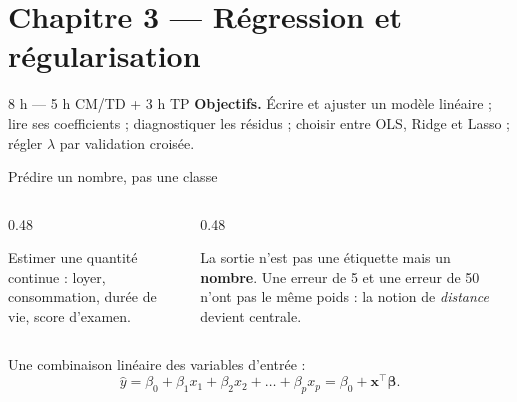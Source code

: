 \section{Chapitre 3 --- Régression et régularisation}

%
{8 h --- 5 h CM/TD + 3 h TP}%
{\textbf{Objectifs.} Écrire et ajuster un modèle linéaire ; lire ses coefficients ;
diagnostiquer les résidus ; choisir entre OLS, Ridge et Lasso ; régler $\lambda$
par validation croisée.}

\begin{frame}{Prédire un nombre, pas une classe}
\begin{columns}[t]
\begin{column}{0.48\textwidth}
\begin{ebox}[Le problème]
Estimer une quantité continue : loyer, consommation, durée de vie, score
d'examen.
\end{ebox}
\end{column}
\begin{column}{0.48\textwidth}
\begin{kbox}
La sortie n'est pas une étiquette mais un \textbf{nombre}. Une erreur de 5 et
une erreur de 50 n'ont pas le même poids : la notion de \emph{distance} devient
centrale.
\end{kbox}
\end{column}
\end{columns}
\vspace{2mm}
\begin{solbox}
Une combinaison linéaire des variables d'entrée :
\[
  \hat y = \beta_0 + \beta_1 x_1 + \beta_2 x_2 + \dots + \beta_p x_p
        = \beta_0 + \mathbf{x}^\top\boldsymbol\beta .
\]
\end{solbox}
\end{frame}

